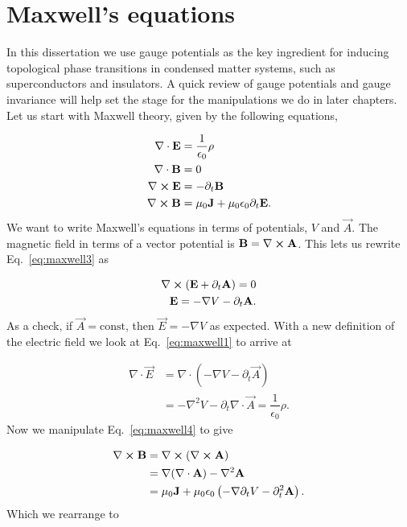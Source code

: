\section{Maxwell's equations}
In this dissertation we use gauge potentials as the key ingredient for inducing topological phase transitions in condensed matter systems, such as superconductors and insulators.
A quick review of gauge potentials and gauge invariance will help set the stage for the manipulations we do in later chapters.
Let us start with Maxwell theory, given by the following equations,

\begin{align}
  \nabla \cdot \mathbf{E} &= \dfrac{1}{\epsilon_0}\rho \label{eq:maxwell1} \\
  \nabla \cdot \mathbf{B} &= 0 \label{eq:maxwell2} \\
  \nabla \cross \mathbf{E} &= -\partial_t \mathbf{B} \label{eq:maxwell3} \\
  \nabla \cross \mathbf{B} &= \mu_0 \mathbf{J} + \mu_0 \epsilon_0 \partial_t \mathbf{E} \label{eq:maxwell4}.
\end{align}
We want to write Maxwell's equations in terms of potentials, $V$ and $\vec{A}$.
The magnetic field in terms of a vector potential is $\mathbf{B} = \nabla \cross \mathbf{A}$.
This lets us rewrite Eq.~\eqref{eq:maxwell3} as

\begin{align}
  \nabla \cross \left( \mathbf{E} + \partial_t \mathbf{A} \right) = 0 \\
  \mathbf{E} = -\nabla V - \partial_t \mathbf{A}.
\end{align}
As a check, if $\vec{A} = \text{const}$, then $\vec{E} = -\nabla V$ as expected.
With a new definition of the electric field we look at Eq.~\eqref{eq:maxwell1} to arrive at

\begin{align}
  \nabla \cdot \vec{E} &= \nabla \cdot \left( -\nabla V - \partial_t \vec{A} \right) \\
  &= -\nabla^2 V - \partial_t \nabla \cdot \vec{A} = \dfrac{1}{\epsilon_0}\rho.
  \label{eq:electric-as-potential}
\end{align}
Now we manipulate Eq.~\eqref{eq:maxwell4} to give

\begin{align}
  \nabla \cross \mathbf{B} &= \nabla \cross (\nabla \cross \mathbf{A}) \\
  &= \nabla (\nabla \cdot \mathbf{A}) - \nabla^2 \mathbf{A} \\
  &= \mu_0 \mathbf{J} + \mu_0 \epsilon_0 \left( -\nabla \partial_t V - \partial_t^2 \mathbf{A} \right).
\end{align}
Which we rearrange to

